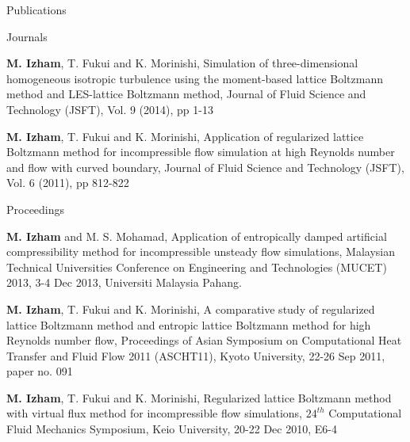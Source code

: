 \documentclass{resume} %
\begin{document}
\begin{rSection}{Publications}
\begin{rSubsection}{Journals}{}{}{}
\item \textbf{M. Izham}, T. Fukui and K. Morinishi, Simulation of three-dimensional homogeneous isotropic turbulence using the moment-based lattice Boltzmann method and LES-lattice Boltzmann method, Journal of Fluid Science and Technology (JSFT), Vol. 9 (2014), pp 1-13 
\item \textbf{M. Izham}, T. Fukui and K. Morinishi, Application of regularized lattice Boltzmann method for incompressible flow simulation at high Reynolds number and flow with curved boundary, Journal of Fluid Science and Technology (JSFT), Vol. 6 (2011), pp 812-822 

\end{rSubsection}


\begin{rSubsection}{Proceedings}{}{}{}
\item \textbf{M. Izham} and M. S. Mohamad, Application of entropically damped artificial compressibility method for incompressible unsteady flow simulations, Malaysian Technical Universities Conference on Engineering and Technologies (MUCET) 2013, 3-4 Dec 2013, Universiti Malaysia Pahang.


\item \textbf{M. Izham}, T. Fukui and K. Morinishi, A comparative study of regularized lattice Boltzmann method and entropic lattice Boltzmann method for high Reynolds number flow, Proceedings of Asian Symposium on Computational Heat Transfer and Fluid Flow 2011 (ASCHT11), Kyoto University, 22-26 Sep 2011, paper no. 091

\item \textbf{M. Izham}, T. Fukui and K. Morinishi, Regularized lattice Boltzmann method with virtual flux method for incompressible flow simulations, $24^{th}$ Computational Fluid Mechanics Symposium, Keio University, 20-22 Dec 2010, E6-4

\end{rSubsection}

\end{rSection}
\end{document}
